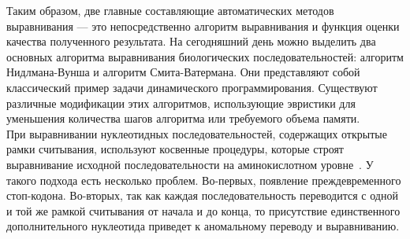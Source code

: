 \indent Таким образом, две главные составляющие автоматических методов выравнивания --- это непосредственно алгоритм выравнивания и функция оценки качества полученного результата. На сегодняшний день можно выделить два основных алгоритма выравнивания биологических последовательностей: алгоритм Нидлмана-Вунша и алгоритм Смита-Ватермана. Они представляют собой классический пример задачи динамического программирования. Существуют различные модификации этих алгоритмов, использующие эвристики для уменьшения количества шагов алгоритма или требуемого объема памяти.\\ 
\indent При выравнивании нуклеотидных последовательностей, содержащих открытые рамки считывания, используют косвенные процедуры, которые строят выравнивание исходной последовательности на аминокислотном уровне~\cite{MACSE}. У такого подхода есть несколько проблем. Во-первых, появление преждевременного стоп-кодона. Во-вторых, так как каждая последовательность переводится с одной и той же рамкой считывания от начала и до конца, то присутствие единственного дополнительного нуклеотида приведет к аномальному переводу и выравниванию.